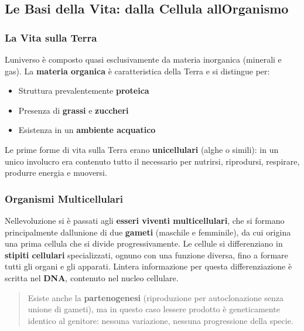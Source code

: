 \documentclass[a4paper,11pt]{article}
\providecommand{\tightlist}{%
  \setlength{\itemsep}{0pt}\setlength{\parskip}{0pt}}
\begin{document}
\subsection{Le Basi della Vita: dalla Cellula
      all\textquotesingle Organismo}\label{le-basi-della-vita-dalla-cellula-allorganismo}

\subsubsection{La Vita sulla Terra}\label{la-vita-sulla-terra}

L\textquotesingle universo è composto quasi esclusivamente da materia
inorganica (minerali e gas). La \textbf{materia organica} è
caratteristica della Terra e si distingue per:

\begin{itemize}
      \tightlist
      \item
            Struttura prevalentemente \textbf{proteica}
      \item
            Presenza di \textbf{grassi} e \textbf{zuccheri}
      \item
            Esistenza in un \textbf{ambiente acquatico}
\end{itemize}

Le prime forme di vita sulla Terra erano \textbf{unicellulari} (alghe o
simili): in un unico involucro era contenuto tutto il necessario per
nutrirsi, riprodursi, respirare, produrre energia e muoversi.

\subsubsection{Organismi Multicellulari}\label{organismi-multicellulari}

Nell\textquotesingle evoluzione si è passati agli \textbf{esseri viventi
      multicellulari}, che si formano principalmente
dall\textquotesingle unione di due \textbf{gameti} (maschile e
femminile), da cui origina una prima cellula che si divide
progressivamente. Le cellule si differenziano in \textbf{stipiti
      cellulari} specializzati, ognuno con una funzione diversa, fino a
formare tutti gli organi e gli apparati. L\textquotesingle intera
informazione per questa differenziazione è scritta nel \textbf{DNA},
contenuto nel nucleo cellulare.

\begin{quote}
      Esiste anche la \textbf{partenogenesi} (riproduzione per autoclonazione
      senza unione di gameti), ma in questo caso l\textquotesingle essere
      prodotto è geneticamente identico al genitore: nessuna variazione,
      nessuna progressione della specie.
\end{quote}
\end{document}
